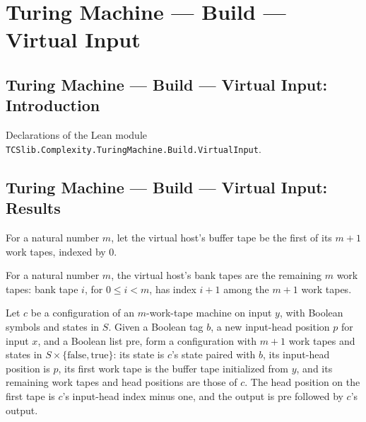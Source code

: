 \section{Turing Machine --- Build --- Virtual Input}
\subsection*{Turing Machine --- Build --- Virtual Input: Introduction}

Declarations of the Lean module \texttt{TCSlib.Complexity.TuringMachine.Build.VirtualInput}.

\subsection*{Turing Machine --- Build --- Virtual Input: Results}

\begin{definition}
\label{Turing.vhostBuffer}
\leanok
For a natural number $m$, let the virtual host’s buffer tape be the first of its $m+1$
work tapes, indexed by $0$.
\end{definition}

\begin{definition}
\label{Turing.vhostBank}
\leanok
For a natural number $m$, the virtual host’s bank tapes are the remaining $m$ work
tapes: bank tape $i$, for $0 \le i < m$, has index $i+1$ among the $m+1$ work tapes.
\end{definition}

\begin{definition}
\label{Turing.vhostCfg}
\leanok
{}
Let $c$ be a configuration of an $m$-work-tape machine on input $y$, with Boolean
symbols and states in $S$. Given a Boolean tag $b$, a new input-head position $p$ for
input $x$, and a Boolean list $\mathrm{pre}$, form a configuration with $m+1$ work tapes
and states in $S\times\{\mathrm{false},\mathrm{true}\}$: its state is $c$’s state paired
with $b$, its input-head position is $p$, its first work tape is the buffer tape
initialized from $y$, and its remaining work tapes and head positions are those of $c$.
The head position on the first tape is $c$’s input-head index minus one, and the output
is $\mathrm{pre}$ followed by $c$’s output.
\end{definition}

